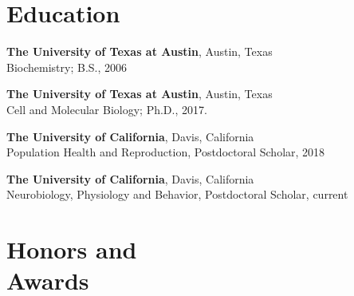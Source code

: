 \documentclass[margin,line]{CV}
\begin{document}
\pagestyle{plain}

\begin{resume}




 
\section{\mysidestyle Education}

\begin{description}[leftmargin=0pt] 
\setlength{\itemsep}{4pt}
\item[] {\bf The University of Texas at Austin}, Austin, Texas \\Biochemistry; B.S., 2006
\item[] {\bf The University of Texas at Austin}, Austin, Texas \\Cell and Molecular Biology; Ph.D., 2017. 
\item[] {\bf The University of California}, Davis, California \\ Population Health and Reproduction, Postdoctoral Scholar, 2018
\item[] {\bf The University of California}, Davis, California \\ Neurobiology, Physiology and Behavior,  Postdoctoral Scholar, current
\end{description}
    

 \section{\mysidestyle Honors and \\ Awards} 


\end{resume}
\end{document}

